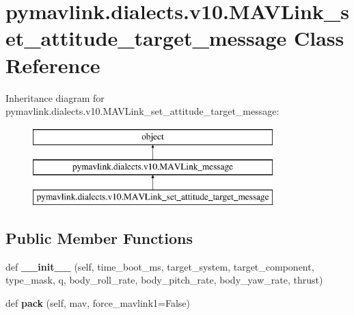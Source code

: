 \hypertarget{classpymavlink_1_1dialects_1_1v10_1_1MAVLink__set__attitude__target__message}{}\section{pymavlink.\+dialects.\+v10.\+M\+A\+V\+Link\+\_\+set\+\_\+attitude\+\_\+target\+\_\+message Class Reference}
\label{classpymavlink_1_1dialects_1_1v10_1_1MAVLink__set__attitude__target__message}
Inheritance diagram for pymavlink.\+dialects.\+v10.\+M\+A\+V\+Link\+\_\+set\+\_\+attitude\+\_\+target\+\_\+message\+:\begin{figure}[H]
\begin{center}
\leavevmode
\includegraphics[height=3.000000cm]{classpymavlink_1_1dialects_1_1v10_1_1MAVLink__set__attitude__target__message}
\end{center}
\end{figure}
\subsection*{Public Member Functions}
\begin{DoxyCompactItemize}
\item 
\mbox{\label{classpymavlink_1_1dialects_1_1v10_1_1MAVLink__set__attitude__target__message_aa6511cd8cf416c65d3f52f05bc83b62b}} 
def {\bfseries \+\_\+\+\_\+init\+\_\+\+\_\+} (self, time\+\_\+boot\+\_\+ms, target\+\_\+system, target\+\_\+component, type\+\_\+mask, q, body\+\_\+roll\+\_\+rate, body\+\_\+pitch\+\_\+rate, body\+\_\+yaw\+\_\+rate, thrust)
\item 
\mbox{\label{classpymavlink_1_1dialects_1_1v10_1_1MAVLink__set__attitude__target__message_ad3b30dd5468e5c91739c392830560487}} 
def {\bfseries pack} (self, mav, force\+\_\+mavlink1=False)
\end{DoxyCompactItemize}

